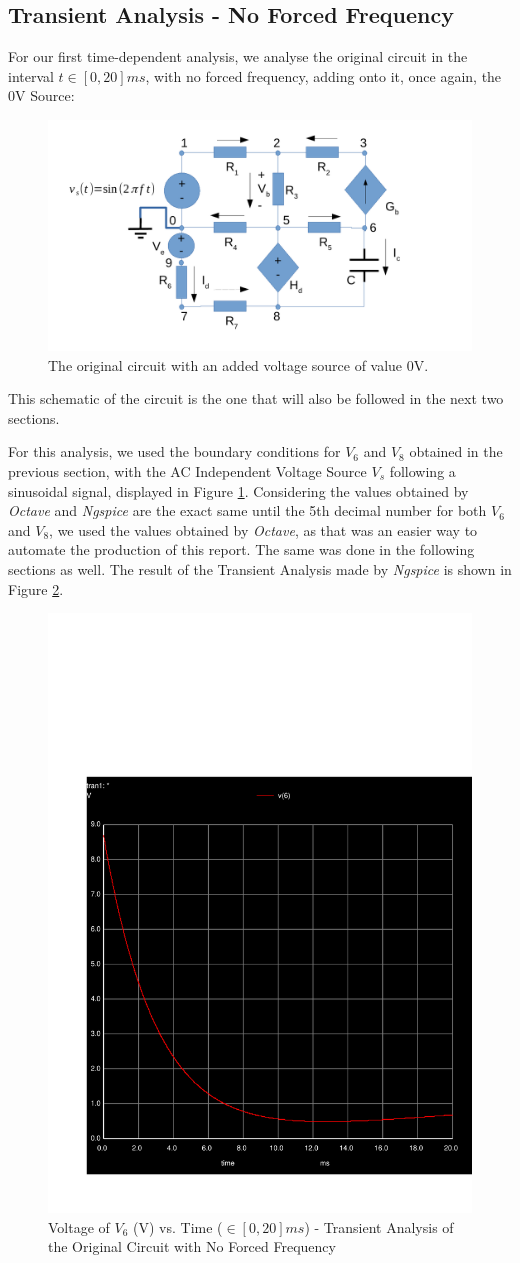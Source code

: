 \clearpage

\subsection{Transient Analysis - No Forced Frequency}

For our first time-dependent analysis, we analyse the original circuit in the interval $t \in [0, 20]ms$, with no forced frequency, adding onto it, once again, the 0V Source:

 

\begin{figure}[h] \centering
\includegraphics[width=0.5\linewidth]{t2-sim345.pdf}
\caption{The original circuit with an added voltage source of value 0V.}
\label{fig:sim345}
\end{figure}

This schematic of the circuit is the one that will also be followed in the next two sections.

For this analysis, we used the boundary conditions for $V_6$ and $V_8$ obtained in the previous section, with the AC Independent Voltage Source $V_s$ following a sinusoidal signal, displayed in Figure \ref{fig:sim345}. Considering the values obtained by \textit{Octave} and \textit{Ngspice} are the exact same until the 5th decimal number for both $V_6$ and $V_8$, we used the values obtained by \textit{Octave}, as that was an easier way to automate the production of this report. The same was done in the following sections as well. The result of the Transient Analysis made by \textit{Ngspice} is shown in Figure \ref{fig:sim-graph3}.

 

\begin{figure}[h] \centering
\includegraphics[width=0.4\linewidth]{../sim/trans3.pdf}
\caption{Voltage of $V_6$ (V) vs. Time ($\in [0, 20]ms$) - Transient Analysis of the Original Circuit with No Forced Frequency}
\label{fig:sim-graph3}
\end{figure}

